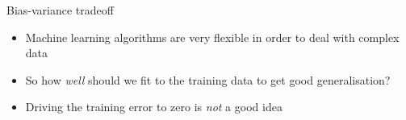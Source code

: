 \documentclass[pdf]{beamer}
\begin{document}
\begin{frame}{Bias-variance tradeoff}
\begin{itemize}\addtolength{\itemsep}{0.5\baselineskip}
	\item Machine learning algorithms are very flexible in order to deal with complex data
	\item So how \textit{well} should we fit to the training data to get good generalisation?
	\item Driving the training error to zero is \textit{not} a good idea
\end{itemize}
\vfill
\begin{center}
\end{center}
\end{frame}
\end{document}
